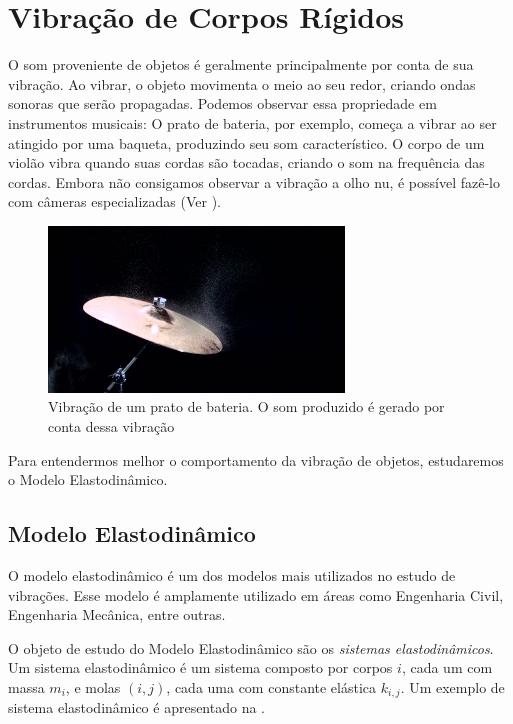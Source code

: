 \section{Vibração de Corpos Rígidos}

O som proveniente de objetos é geralmente principalmente por conta de sua vibração. Ao vibrar, o objeto movimenta o meio ao seu redor, criando ondas sonoras que serão propagadas. Podemos observar essa propriedade em instrumentos musicais: O prato de bateria, por exemplo, começa a vibrar ao ser atingido por uma baqueta, produzindo seu som característico. O corpo de um violão vibra quando suas cordas são tocadas, criando o som na frequência das cordas. Embora não consigamos observar a vibração a olho nu, é possível fazê-lo com câmeras especializadas (Ver ).

\begin{figure}[ht]
	\centering
	\includegraphics[width=0.7\textwidth]{mathematicalbackground/cymbal.jpg}
	\caption[Vibração de um prato de bateria.]{Vibração de um prato de bateria. O som produzido é gerado por conta dessa vibração\footnotemark}
	\label{fig:vibrating_cymbal}
\end{figure}


Para entendermos melhor o comportamento da vibração de objetos, estudaremos o Modelo Elastodinâmico. 

\subsection{Modelo Elastodinâmico}
O modelo elastodinâmico \cite{shabana2012theory} é um dos modelos mais utilizados no estudo de vibrações. Esse modelo é amplamente utilizado em áreas como Engenharia Civil, Engenharia Mecânica, entre outras. 

O objeto de estudo do Modelo Elastodinâmico são os \emph{sistemas elastodinâmicos}. Um sistema elastodinâmico é um sistema composto por corpos $i$, cada um com massa $m_i$, e molas $(i,j)$, cada uma com constante elástica $k_{i,j}$. Um exemplo de sistema elastodinâmico é apresentado na .

